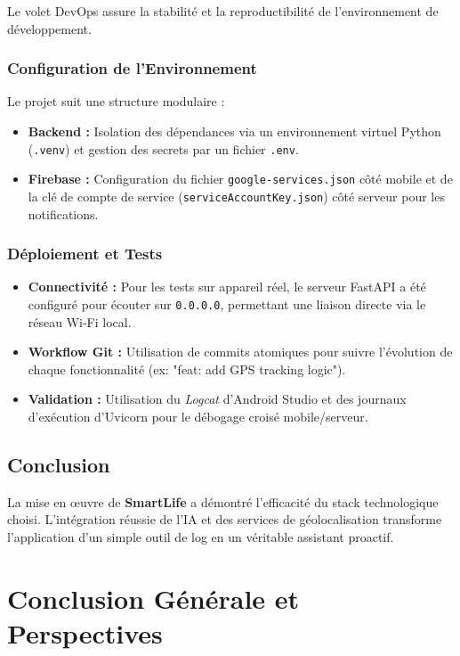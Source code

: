 \documentclass[12pt,a4paper,oneside]{report}
\begin{document}
Le volet DevOps assure la stabilité et la reproductibilité de l'environnement de développement.

\subsection{Configuration de l'Environnement}
Le projet suit une structure modulaire :
\begin{itemize}
    \item \textbf{Backend :} Isolation des dépendances via un environnement virtuel Python (\texttt{.venv}) et gestion des secrets par un fichier \texttt{.env}.
    \item \textbf{Firebase :} Configuration du fichier \texttt{google-services.json} côté mobile et de la clé de compte de service (\texttt{serviceAccountKey.json}) côté serveur pour les notifications.
\end{itemize}

\subsection{Déploiement et Tests}
\begin{itemize}
    \item \textbf{Connectivité :} Pour les tests sur appareil réel, le serveur FastAPI a été configuré pour écouter sur \texttt{0.0.0.0}, permettant une liaison directe via le réseau Wi-Fi local.
    \item \textbf{Workflow Git :} Utilisation de commits atomiques pour suivre l'évolution de chaque fonctionnalité (ex: "feat: add GPS tracking logic").
    \item \textbf{Validation :} Utilisation du \textit{Logcat} d'Android Studio et des journaux d'exécution d'Uvicorn pour le débogage croisé mobile/serveur.
\end{itemize}

\section*{Conclusion}

La mise en œuvre de \textbf{SmartLife} a démontré l'efficacité du stack technologique choisi. L'intégration réussie de l'IA et des services de géolocalisation transforme l'application d'un simple outil de log en un véritable assistant proactif.

\chapter*{Conclusion Générale et Perspectives}
\end{document}
